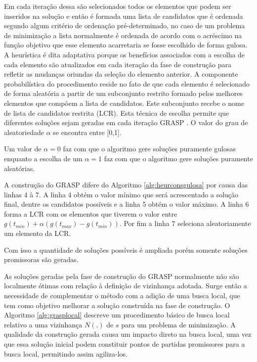 Em cada iteração dessa são selecionados todos os elementos que podem ser inseridos na solução e então é formada uma lista de candidatos que é ordenada segundo algum critério de ordenação pré-determinado, no caso de um problema de minimização a lista normalmente é ordenada de acordo com o acréscimo na função objetivo que esse elemento acarretaria se fosse escolhido de forma gulosa. A heurística
é dita adaptativa porque os benefícios associados com a escolha de cada elemento são atualizados em cada iteração da fase de construção para refletir as mudanças oriundas da seleção do elemento anterior. A componente probabilística do procedimento reside no fato
de que cada elemento é selecionado de forma aleatória a partir de um subconjunto restrito formado pelos melhores elementos que compõem a lista de candidatos. Este subconjunto recebe o nome de lista de candidatos restrita (LCR). Esta técnica de escolha permite que
diferentes soluções sejam geradas em cada iteração GRASP \cite{notasmarcone}. O valor do grau de aleatoriedade $\alpha$ se encontra entre [0,1].

Um valor de $\alpha = 0$ faz com que o algoritmo gere soluções puramente gulosas enquanto a escolha de um $\alpha = 1$ faz com que o algoritmo gere soluções puramente aleatórias.
 
A construção do GRASP difere do Algoritmo \ref{alg:heurconsgulosa} por causa das linhas 4 à 7. A linha 4 obtém o valor mínimo que será acrescentado a solução final, dentre os candidatos possíveis e a linha 5 obtém o valor máximo. A linha 6 forma a LCR com os elementos que tiverem o valor entre $g(t_{min}) + \alpha(g(t_{max}) - g(t_{min}))$. Por fim a linha 7 seleciona aleatoriamente um elemento da LCR.

Com isso a quantidade de soluções possíveis é ampliada porém somente soluções promissoras são geradas.

As soluções geradas pela fase de construção do GRASP normalmente não são localmente ótimas com relação à definição de vizinhança adotada. Surge então a necessidade de complementar o método com a adição de uma busca local, que tem como objetivo melhorar a solução construída na fase de construção. O Algoritmo \ref{alg:grasplocal} descreve um procedimento básico de busca local relativo a uma vizinhança $N(.)$ de $s$ para um problema de minimização. A qualidade da construção gerada causa um impacto direto na busca local, uma vez que essa solução inicial podem constituir pontos de partidas promissores para a busca local, permitindo assim agiliza-los.

